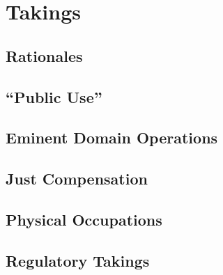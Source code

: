 \chapter{Takings}




\section{Rationales}




\section{``Public Use''}







\begin{questions}

\end{questions}



\section{Eminent Domain Operations}




\section{Just Compensation}






\section{Physical Occupations}





\begin{questions}

\end{questions}


\section{Regulatory Takings}


